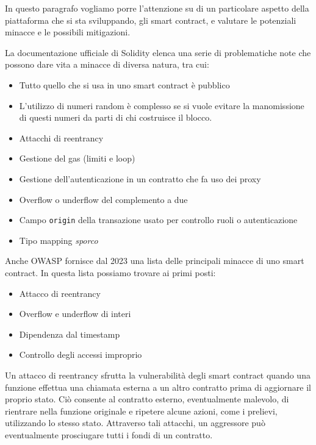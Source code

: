 \documentclass[a4paper,11pt]{article}
\begin{document}
In questo paragrafo vogliamo porre l'attenzione su di un particolare aspetto della piattaforma che si sta sviluppando, gli smart contract, e valutare le potenziali minacce e le possibili mitigazioni.

La documentazione ufficiale di Solidity elenca una serie di problematiche note \cite{soliditylangSolidityx2014} che possono dare vita a minacce di diversa natura, tra cui:

\begin{itemize}
  \item Tutto quello che si usa in uno smart contract è pubblico
  \item L'utilizzo di numeri random è complesso se si vuole evitare la manomissione di questi numeri da parti di chi costruisce il blocco.
  \item Attacchi di reentrancy
  \item Gestione del gas (limiti e loop)
  \item Gestione dell'autenticazione in un contratto che fa uso dei proxy
  \item Overflow o underflow del complemento a due
  \item Campo \texttt{origin} della transazione usato per controllo ruoli o autenticazione
  \item Tipo mapping \textit{sporco}
\end{itemize}

Anche OWASP fornisce dal 2023 una lista \cite{owaspOWASPSmart} delle principali minacce di uno smart contract. In questa lista possiamo trovare ai primi posti:

\begin{itemize}
  \item Attacco di reentrancy
  \item Overflow e underflow di interi
  \item Dipendenza dal timestamp
  \item Controllo degli accessi improprio
\end{itemize}

Un attacco di reentrancy sfrutta la vulnerabilità degli smart contract quando una funzione effettua una chiamata esterna a un altro contratto prima di aggiornare il proprio stato. Ciò consente al contratto esterno, eventualmente malevolo, di rientrare nella funzione originale e ripetere alcune azioni, come i prelievi, utilizzando lo stesso stato. Attraverso tali attacchi, un aggressore può eventualmente prosciugare tutti i fondi di un contratto. \cite{owaspOWASPSmart}
\end{document}
